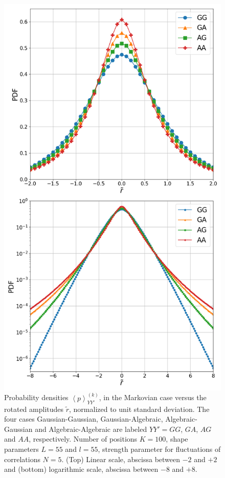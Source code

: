 \begin{figure}[htbp]
    \centering
    \includegraphics[width=\columnwidth]
    {figures/05_distributions_comparison.png}
    \caption{Probability densities $\left\langle p \right\rangle_{YY'}^{\left(k\right)}$,
             in the Markovian case versus the rotated amplitudes $\tilde{r}$,
             normalized to unit standard deviation. The four cases Gaussian-Gaussian,
             Gaussian-Algebraic, Algebraic-Gaussian and Algebraic-Algebraic are
             labeled $YY' = GG$, $GA$, $AG$ and $AA$, respectively. Number of
             positions $K = 100$, shape parameters $L = 55$ and $l = 55$, strength
             parameter for fluctuations of correlations $N = 5$. (Top) Linear scale,
             abscissa between $-2$ and $+2$ and (bottom) logarithmic scale, abscissa
             between $-8$ and $+8$.}
    \label{fig:distributions_comparison}
\end{figure}

